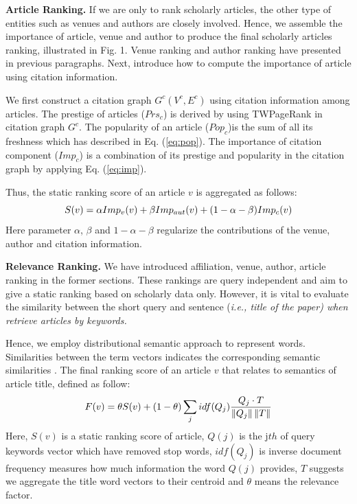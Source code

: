 {\textbf{Article Ranking.}
If we are only to rank scholarly articles, the other type of entities such as venues and authors are closely involved. Hence, we assemble the importance of article, venue and author to produce the final scholarly articles ranking, illustrated in Fig. 1. Venue ranking and author ranking have presented in previous paragraphs. Next, introduce how to compute the importance of article using citation information.

\par
We first construct a citation graph $G^c(V^c, E^c)$ using citation information among articles. The prestige of articles ($Prs_c$) is derived by using TWPageRank in citation graph $G^c$. The popularity of an article ($Pop_c$)is the sum of all its freshness which has described in Eq. (\ref{eq:pop}). The importance of citation component ($Imp_c$) is a combination of its prestige and popularity in the citation graph by applying Eq. (\ref{eq:imp}).

\par
Thus, the static ranking score of an article $v$ is aggregated as follows:
\begin{equation}
\centering
\label{eq:assemble}
S(v) = \alpha Imp_v(v) + \beta Imp_{aut}(v) + (1 - \alpha - \beta)Imp_c(v)
\end{equation}
Here parameter $\alpha$, $\beta$ and $1- \alpha - \beta$  regularize the contributions of the venue, author and citation information.


\textbf{Relevance Ranking.} We have introduced affiliation, venue, author, article ranking in the former sections. These rankings are query independent and
aim to give a static ranking based on scholarly data only. However, it is vital to evaluate the similarity between the short query and sentence (\itshape i.e., \upshape title of the paper) when retrieve articles by keywords.

\par
Hence, we employ distributional semantic approach to represent words. Similarities between the term vectors indicates the corresponding semantic similarities \cite{corrado2013efficient}. The final ranking score of an article $v$ that relates to semantics of article title, defined as follow:
\begin{equation}
\centering
\label{eq:simscore}
F(v) = \theta S(v) + (1- \theta) \sum_j idf(Q_j) \frac {Q_j \cdot T} {\left \| Q_j \right \| \left \| T \right \|}
\end{equation}
Here, $S(v)$ is a static ranking score of article, $Q(j)$ is the j$th$ of query keywords vector which have removed stop words, $idf(Q_j)$ is inverse document frequency measures how much information the word $Q(j)$ provides, $T$ suggests we aggregate the title word vectors to their centroid and $\theta$ means the relevance factor.
} %
